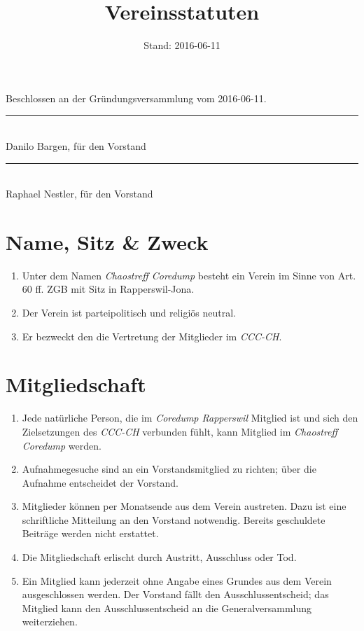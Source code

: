 \documentclass[10pt,a4paper,parskip,fleqn]{scrartcl}
\title{\Huge Vereinsstatuten}
\date{Stand: 2016-06-11}
\newcommand{\ol}{\begin{enumerate}[itemsep=-0.2em,topsep=-0.2em]}
\newcommand{\lo}{\end{enumerate}}
\newcommand{\li}{\item}
\newcommand{\name}{Chaostreff Coredump\xspace}
\newcommand{\iname}{\textit{\name}\xspace}
\newcommand{\parent}{Coredump Rapperswil\xspace}
\newcommand{\iparent}{\textit{\parent}\xspace}
\newcommand{\cccch}{CCC-CH\xspace}
\newcommand{\icccch}{\textit{\cccch}\xspace}
\begin{document}
\begin{titlepage}

	\maketitle
	\thispagestyle{empty} %

  \begin{center}

		\vspace{1cm}

		\theverbbox

		\vfill

		\large Beschlossen an der Gründungsversammlung vom 2016-06-11.

		\vspace{1.5cm}

		\begin{minipage}[t]{0.49\textwidth}
			\center
			\rule{5cm}{0.2mm}\\
			Danilo Bargen, für den Vorstand
		\end{minipage}
		\begin{minipage}[t]{0.49\textwidth}
			\center
			\rule{5cm}{0.2mm}\\
			Raphael Nestler, für den Vorstand
		\end{minipage}

  \end{center}

\end{titlepage}


\section{Name, Sitz \& Zweck}

\ol
	\li Unter dem Namen \iname besteht ein Verein im Sinne von Art. 60
	ff. ZGB mit Sitz in Rapperswil-Jona.
	\li Der Verein ist parteipolitisch und religiös neutral.
	\li Er bezweckt den die Vertretung der Mitglieder im \icccch.
\lo


\section{Mitgliedschaft}

\ol
  \li Jede natürliche Person, die im \iparent Mitglied ist und sich den
	Zielsetzungen des \icccch verbunden fühlt, kann Mitglied im \iname werden.
	\li Aufnahmegesuche sind an ein Vorstandsmitglied zu richten; über die
	Aufnahme entscheidet der Vorstand.
	\li Mitglieder können per Monatsende aus dem Verein austreten. Dazu ist eine
	schriftliche Mitteilung an den Vorstand notwendig. Bereits geschuldete
	Beiträge werden nicht erstattet.
	\li Die Mitgliedschaft erlischt durch Austritt, Ausschluss oder Tod.
	\li Ein Mitglied kann jederzeit ohne Angabe eines Grundes aus dem Verein
	ausgeschlossen werden. Der Vorstand fällt den Ausschlussentscheid; das
	Mitglied kann den Ausschlussentscheid an die Generalversammlung weiterziehen.
\lo
\end{document}
